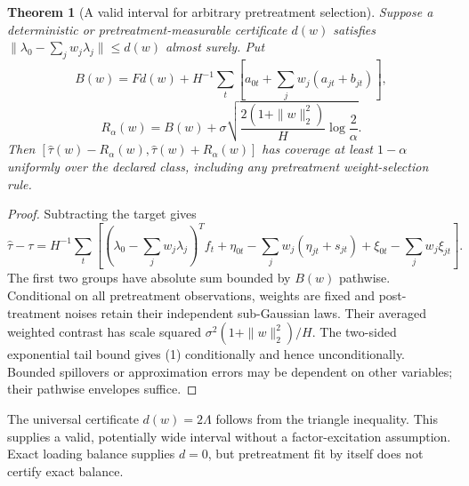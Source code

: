 \documentclass[11pt,a4paper]{article}
\newtheorem{theorem}{Theorem}[section]
\begin{document}
\begin{theorem}[A valid interval for arbitrary pretreatment selection]
Suppose a deterministic or pretreatment-measurable certificate $d(w)$ satisfies $\|\lambda_0-\sum_jw_j\lambda_j\|\le d(w)$ almost surely. Put
\[
 B(w)=Fd(w)+H^{-1}\sum_t\left[a_{0t}+\sum_jw_j(a_{jt}+b_{jt})\right],
\]
\[
 R_\alpha(w)=B(w)+\sigma\sqrt{\frac{2(1+\|w\|_2^2)}H\log\frac2\alpha}.
 \tag{1}
\]
Then $[\widehat\tau(w)-R_\alpha(w),\widehat\tau(w)+R_\alpha(w)]$ has coverage at least $1-\alpha$ uniformly over the declared class, including any pretreatment weight-selection rule.
\end{theorem}
\begin{proof}
Subtracting the target gives
\[
 \widehat\tau-\tau=H^{-1}\sum_t\left[
 (\lambda_0-\sum_jw_j\lambda_j)^Tf_t+
 \eta_{0t}-\sum_jw_j(\eta_{jt}+s_{jt})+
 \xi_{0t}-\sum_jw_j\xi_{jt}\right].
\]
The first two groups have absolute sum bounded by $B(w)$ pathwise. Conditional on all pretreatment observations, weights are fixed and post-treatment noises retain their independent sub-Gaussian laws. Their averaged weighted contrast has scale squared $\sigma^2(1+\|w\|_2^2)/H$. The two-sided exponential tail bound gives (1) conditionally and hence unconditionally. Bounded spillovers or approximation errors may be dependent on other variables; their pathwise envelopes suffice.
\end{proof}

The universal certificate $d(w)=2\Lambda$ follows from the triangle inequality. This supplies a valid, potentially wide interval without a factor-excitation assumption. Exact loading balance supplies $d=0$, but pretreatment fit by itself does not certify exact balance.
\end{document}
